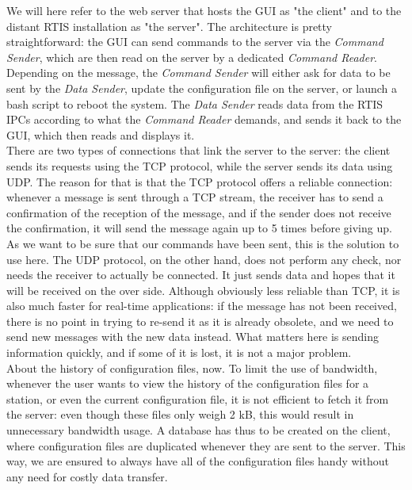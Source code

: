 \documentclass{themeensg}
\begin{document}
We will here refer to the web server that hosts the GUI as "the client" and to the distant RTIS installation as "the server".
The architecture is pretty straightforward: the GUI can send commands to the server via the \textit{Command Sender}, which are then read on the server by a dedicated \textit{Command Reader}. Depending on the message, the \textit{Command Sender} will either ask for data to be sent by the \textit{Data Sender}, update the configuration file on the server, or launch a bash script to reboot the system. The \textit{Data Sender} reads data from the RTIS IPCs according to what the \textit{Command Reader} demands, and sends it back to the GUI, which then reads and displays it.\\

There are two types of connections that link the server to the server: the client sends its requests using the TCP protocol, while the server sends its data using UDP. The reason for that is that the TCP protocol offers a reliable connection: whenever a message is sent through a TCP stream, the receiver has to send a confirmation of the reception of the message, and if the sender does not receive the confirmation, it will send the message again up to 5 times before giving up. As we want to be sure that our commands have been sent, this is the solution to use here.
The UDP protocol, on the other hand, does not perform any check, nor needs the receiver to actually be connected. It just sends data and hopes that it will be received on the over side. Although obviously less reliable than TCP, it is also much faster for real-time applications: if the message has not been received, there is no point in trying to re-send it as it is already obsolete, and we need to send new messages with the new data instead. What matters here is sending information quickly, and if some of it is lost, it is not a major problem.\\

About the history of configuration files, now. To limit the use of bandwidth, whenever the user wants to view the history of the configuration files for a station, or even the current configuration file, it is not efficient to fetch it from the server: even though these files only weigh 2 kB, this would result in unnecessary bandwidth usage.
A database has thus to be created on the client, where configuration files are duplicated whenever they are sent to the server. This way, we are ensured to always have all of the configuration files handy without any need for costly data transfer.
\end{document}
